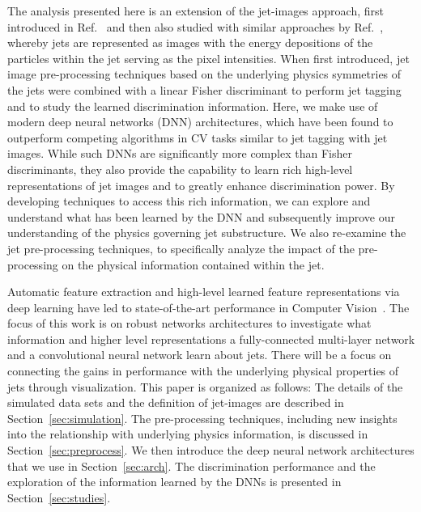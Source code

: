 \documentclass{article}
\begin{document}
The analysis presented here is an extension of the jet-images approach, first introduced in Ref.~\cite{Cogan:2014oua} and then also studied with similar approaches by Ref.~\cite{Almeida:2015jua}, whereby jets are represented as images with the energy depositions of the particles within the jet serving as the pixel intensities.  When first introduced, jet image pre-processing techniques based on the underlying physics symmetries of the jets were combined with a linear Fisher discriminant to perform jet tagging and to study the learned discrimination information.  Here, we make use of modern deep neural networks (DNN) architectures, which have been found to outperform competing algorithms in CV tasks similar to jet tagging with jet images.  While such DNNs are significantly more complex than Fisher discriminants, they also provide the capability to learn rich high-level representations of jet images and to greatly enhance discrimination power.  By developing techniques to access this rich information, we can explore and understand what has been learned by the DNN and subsequently improve our understanding of the physics governing jet substructure.  We also re-examine the jet pre-processing techniques, to specifically analyze the impact of the pre-processing on the physical information contained within the jet.

%

Automatic feature extraction and high-level learned feature representations via deep learning have led to state-of-the-art performance in Computer Vision~\cite{vggnet,maxout:goodfellow,dropout:and:LRN}.  The focus of this work is on robust networks architectures to investigate what information and higher level representations a fully-connected multi-layer network and a convolutional neural network learn about jets.  There will be a focus on connecting the gains in performance with the underlying physical properties of jets through visualization. This paper is organized as follows:  The details of the simulated data sets and the definition of jet-images are described in Section~\ref{sec:simulation}.    The pre-processing techniques, including new insights into the relationship with underlying physics information, is discussed in Section~\ref{sec:preprocess}.  We then introduce the deep neural network architectures that we use in Section~\ref{sec:arch}.  The discrimination performance and the exploration of the information learned by the DNNs is presented in Section~\ref{sec:studies}.


\end{document}

